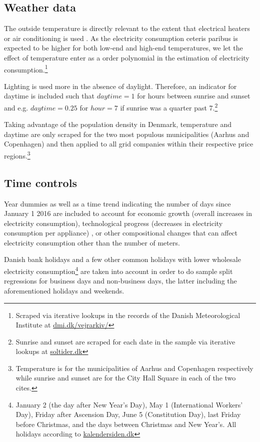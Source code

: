\subsection{Weather data}
\label{subsec:d_weather}
The outside temperature is directly relevant to the extent that electrical heaters or air conditioning is used \citep{lijesen2007real, vesterberg2014residential}. As the electricity consumption ceteris paribus is expected to be higher for both low-end and high-end temperatures, we let the effect of temperature enter as a  order polynomial in the estimation of electricity consumption.\footnote{Scraped via iterative lookups in the records of the Danish Meteorological Institute at \href{https://www.dmi.dk/vejrarkiv/}{dmi.dk/vejrarkiv/}}
\bigskip\par
Lighting is used more in the absence of daylight. Therefore, an indicator for daytime is included such that $daytime=1$ for hours between sunrise and sunset and e.g. $daytime=0.25$ for $hour=7$ if sunrise was a quarter past 7.\footnote{Sunrise and sunset are scraped for each date in the sample via iterative lookups at \href{https://soltider.dk/}{soltider.dk}}
\bigskip\par
Taking advantage of the population density in Denmark, temperature and daytime are only scraped for the two most populous municipalities (Aarhus and Copenhagen) and then applied to all grid companies within their respective price regions.\footnote{Temperature is for the municipalities of Aarhus and Copenhagen respectively while sunrise and sunset are for the City Hall Square in each of the two cites.}

\subsection{Time controls}
\label{subsec:d_time}
Year dummies as well as a time trend indicating the number of days since January 1 2016 are included to account for economic growth (overall increases in electricity consumption), technological progress (decreases in electricity consumption per appliance) \citep{lijesen2007real}, or other compositional changes that can affect electricity consumption other than the number of meters.
\bigskip\par
Danish bank holidays and a few other common holidays with lower wholesale electricity consumption\footnote{January 2 (the day after New Year's Day), May 1 (International Workers' Day), Friday after Ascension Day, June 5 (Constitution Day), last Friday before Christmas, and the days between Christmas and New Year's. All holidays according to \href{https://kalendersiden.dk/}{kalendersiden.dk}} are taken into account in order to do sample split regressions for business days and non-business days, the latter including the aforementioned holidays and weekends.
